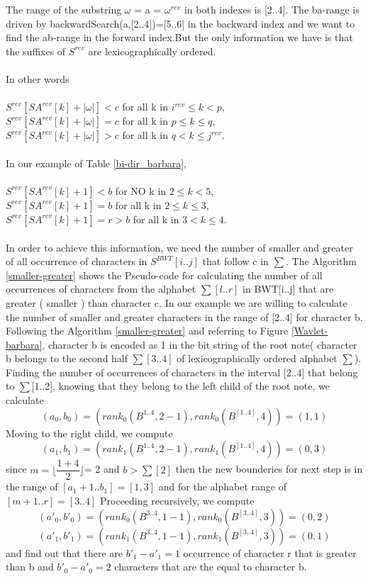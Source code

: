 \documentclass[11pt,a4paper]{report}
\begin{document}
The range of the substring   
$\omega$ = a = $\omega^{rev}$ in both indexes is [2..4].
The ba-range is driven by backwardSearch(a,[2..4])=[5..6]  
in the backward index and we want to find the ab-range in
the forward index.But the only information we have is that 
the suffixes of $S^{rev}$ are lexicographically ordered. \\\\
In other words\\\\
$S^{rev}[SA^{rev}[k]+|\omega|] < c$ for all k in $i^{rev}  \leq k  < p$,\\
$S^{rev}[SA^{rev}[k]+|\omega|] = c$ for all k in  $p  \leq  k  \leq  q $,\\
$S^{rev}[SA^{rev}[k]+|\omega|] > c$ for all k in  $q <   k \leq   j^{rev}$.\\\\
In our example of Table \ref{bi-dir_barbara},\\\\
$S^{rev}[SA^{rev}[k]+1] < b $ for NO  k in $ 2 \leq k  < 5 $,\\
$S^{rev}[SA^{rev}[k]+1] = b $ for all k in $ 2  \leq  k  \leq  3 $,\\
$S^{rev}[SA^{rev}[k]+1] = r > b $ for all k in $ 3   < k  \leq  4 $.\\\\
In order to achieve this information, we need the number of smaller
and greater of all occurrence of characters in $S^{BWT}[i..j]$ 
that follow c in $\sum$. The Algorithm \ref{smaller-greater} 
shows  the Pseudo-code for calculating the number of all occurrences 
of characters from the alphabet $\sum[l..r]$ in BWT[i..j] that 
are greater ( smaller ) than character c. In our example 
we are willing to calculate the number of smaller and greater 
characters in the range of [2..4] for character b.  
Following the Algorithm \ref{smaller-greater} 
and referring to Figure \ref{Wavlet-barbara}, character
b is encoded as 1 in the bit string of the root note( character b belongs 
to the second half $\sum[3..4]$ of lexicographically ordered 
alphabet $\sum$).
Finding the number of occurrences of characters 
in the interval [2..4] that belong to $\sum$[1..2], knowing that 
they belong to the left child of the root note, we calculate\\
$$(a_{0}, b_{0})=(rank_{0} ( B^{1..4} ,  2-1), rank_{0} (B^[1..4] , 4)) = (1 , 1) $$
Moving to the right child, we compute
$$(a_{1}, b_{1})=(rank_{1} ( B^{1..4} ,  2-1), rank_{1} (B^[1..4] , 4)) = (0 , 3) $$
since  $m=\lfloor \dfrac  {1+4}{2} \rfloor$= 2 and $b >\sum[2]$ then
the new bounderies for next step is in the range of $[a_{1}+1..b_{1}]
=[1,3]$ and for the alphabet range of $[m+1..r] = [3..4]$
Proceeding recursively, we compute
$$(a\prime_{0}, b\prime_{0})=(rank_{0} ( B^{3..4} ,  1-1), rank_{0} (B^[3..4] , 3)) = (0 , 2) $$
$$(a\prime_{1}, b\prime_{1})=(rank_{1} ( B^{3..4} ,  1-1), rank_{1} (B^[3..4] , 3)) = (0 , 1) $$
and find out that there are $b\prime_{1}-a\prime_{1}=1$ occurrence 
of character r that is greater than b and $b\prime_{0}-a\prime_{0}=2 $ 
characters that are the equal to character b.
\end{document}
